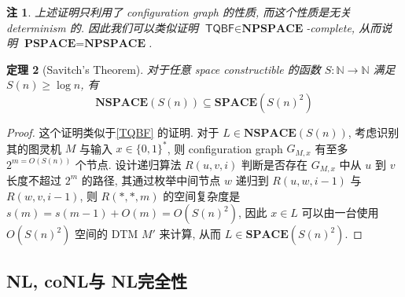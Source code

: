 \documentclass[8pt]{article}
\theoremstyle{compact}
\newtheorem{theorem}{定理}[section]
\newtheorem{remark}[theorem]{注}
\def\ge{\geqslant}
\def\SPACE{\textbf{SPACE}}
\def\NSPACE{\textbf{NSPACE}}
\def\PSPACE{\textbf{PSPACE}}
\def\NPSPACE{\textbf{NPSPACE}}
\def\NL{\textbf{NL}}
\def\coNL{\textbf{coNL}}
\begin{document}
\begin{remark}
	上述证明只利用了 configuration graph 的性质, 而这个性质是无关 determinism 的. 因此我们可以类似证明 $\textsf{TQBF} \in \NPSPACE$-complete, 从而说明 $\PSPACE = \NPSPACE$.
\end{remark}
\begin{theorem}[Savitch's Theorem]
	对于任意 space constructible 的函数 $S: \mathbb N \to \mathbb N$ 满足 $S(n) \ge \log n$, 有 $$\NSPACE(S(n)) \subseteq \SPACE(S(n)^2)$$
\end{theorem}
\begin{proof}
	这个证明类似于\cref{TQBF} 的证明. 对于 $L \in \NSPACE(S(n))$, 考虑识别其的图灵机 $M$ 与输入 $x \in \{0, 1\}^*$, 则 configuration graph $G_{M, x}$ 有至多 $2^{m = O(S(n))}$ 个节点. 设计递归算法 $R(u, v, i)$ 判断是否存在 $G_{M, x}$ 中从 $u$ 到 $v$ 长度不超过 $2^m$ 的路径, 其通过枚举中间节点 $w$ 递归到 $R(u, w, i - 1)$ 与 $R(w, v, i - 1)$, 则 $R(*, *, m)$ 的空间复杂度是 $s(m) = s(m - 1) + O(m) = O(S(n)^2)$, 因此 $x \in L$ 可以由一台使用 $O(S(n)^2)$ 空间的 DTM $M'$ 来计算, 从而 $L \in \SPACE(S(n)^2)$.
\end{proof}


\subsection{\NL, \coNL 与 \NL 完全性}
\end{document}
